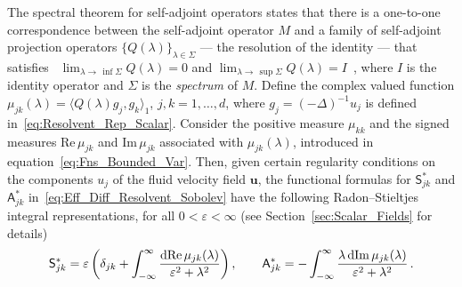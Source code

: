 \documentclass[leqno,onefignum,onetabnum]{siamltex1213}
\newcommand{\secref}[1]{Section~\ref{#1}}
\renewcommand{\d}{\mathrm{d}}
\newcommand\Real{\mbox{Re}\,} %
\newcommand\Imag{\mbox{Im}\,} %
\newcommand{\Sm}{\mathsf{S}}
\newcommand{\Am}{\mathsf{A}}
\newcommand{\vecu}{\boldsymbol{u}}
\begin{document}
The spectral theorem for self-adjoint operators states that there is a
one-to-one correspondence between the self-adjoint operator $M$ and a
family of self-adjoint projection operators $\{Q(\lambda)\}_{\lambda\in\Sigma}$ --- the
resolution of the identity --- that satisfies~\cite{Stone:64} 
$\lim_{\lambda\to\,\inf{\Sigma}}Q(\lambda)=0$ and
$\lim_{\lambda\to\,\sup{\Sigma}}Q(\lambda)=I$~\cite{Stone:64}, where $I$ is the identity
operator and $\Sigma$ is the \emph{spectrum} of $M$. Define the complex
valued function $\mu_{jk}(\lambda)=\langle Q(\lambda)g_j,g_k\rangle_1$, $j,k=1,\ldots,d$, where
$g_j=(-\Delta)^{-1}u_j$ is defined
in~\eqref{eq:Resolvent_Rep_Scalar}. Consider the positive measure
$\mu_{kk}$ and the signed measures $\Real\mu_{jk}$ and $\Imag\mu_{jk}$
associated with $\mu_{jk}(\lambda)$, introduced in
equation~\eqref{eq:Fns_Bounded_Var}.  Then, given certain regularity 
conditions on the components $u_j$ of the fluid velocity field
$\vecu$, the functional formulas for $\Sm^*_{jk}$ and
$\Am^*_{jk}$ in~\eqref{eq:Eff_Diff_Resolvent_Sobolev} have
the following Radon--Stieltjes integral representations, for all
$0<\varepsilon<\infty$ (see \secref{sec:Scalar_Fields} for details)
%
\begin{align}\label{eq:Integral_Rep_kappa*}
  \Sm^*_{jk}=\varepsilon\left(\delta_{jk}+\int_{-\infty}^\infty\frac{\d{\rm Re}\,\mu_{jk}(\lambda)}{\varepsilon^2+\lambda^2}\right),
  \qquad
  \Am^*_{jk}=-\int_{-\infty}^\infty\frac{\lambda\,\d{\rm Im}\,\mu_{jk}(\lambda)}{\varepsilon^2+\lambda^2}\,.         
\end{align}
\end{document}
